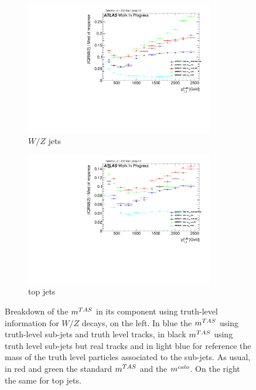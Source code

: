 
\begin{figure}
    \centering
    \begin{subfigure}[b]{0.45\textwidth}
  \centering
      \includegraphics[width=0.9\textwidth]{jet_part/calib/71graphcftr_h_JetRatio_mJ12CALOIQRoM4Truths.pdf}
  \caption[Breakdown of the $\mtas$ ]{$W/Z$ jets}
  \label{fig:breakdown2}
    \end{subfigure}
    \begin{subfigure}[b]{0.45\textwidth}
  \centering
      \includegraphics[width=0.9\textwidth]{jet_part/appendixA/71graphcftr_h_JetRatio_mJ12CALOIQRoM4TruthsTops.pdf}
  \caption[Breakdown of the $\mtas$ ]{top jets}
  \label{fig:breakdown3}
 
    \end{subfigure}
    \caption[Breakdown of the $\mtas$]{Breakdown of the $\mtas$ in its component using truth-level information for $W/Z$ decays, on the left. In blue the $\mtas$ using truth-level sub-jets and truth level tracks, in black $\mtas$ using truth level sub-jets but real tracks and in light blue for reference the mass of the truth level particles associated to the sub-jets. As usual, in red and green the standard $\mtas$ and the $m^{calo}$. On the right the same for top jets.} 
\end{figure}

